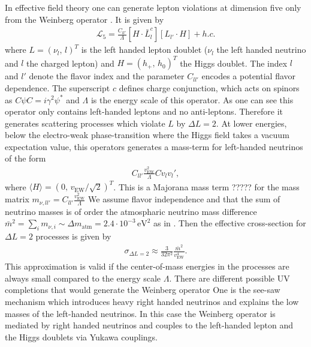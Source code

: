 \documentclass[13pt,a4paper,twoside,titlepage]{article}
\begin{document}
In effective field theory one can generate lepton violations at dimension five only from the
Weinberg operator \cite{Weinberg_operator_original_PhysRevLett.43.1566}. It is given by \cite[eq. 2]{Weinberg_at_colliders_Fuks_2021}
\begin{align}
\mathcal{L}_5 = \frac{C_{l l'}}{\Lambda} [H \cdot \bar{L}^c_l] [L_{l'} \cdot H] + h.c.
\end{align}
where $L = (\nu_l,\, l)^T$ is the left handed lepton doublet ($\nu_l$ the left handed neutrino and $l$ the charged lepton) and $H = (h_+,\, h_0)^T$ the Higgs doublet. The index $l$ and $l'$ denote the flavor index and the parameter $C_{l l'}$ encodes a potential flavor dependence.
The superscript $c$ defines charge conjunction, which acts on spinors as $C \psi C = i \gamma^2 \psi^*$
and $\Lambda$ is the energy scale of this operator.
As one can see this operator only contains left-handed leptons and no anti-leptons. Therefore
it generates scattering processes which violate $L$ by $\Delta L = 2$.
At lower energies, below the electro-weak phase-transition where the Higgs field takes a vacuum expectation value, this operators generates a mass-term for left-handed neutrinos of the form
\begin{align}
C_{ll'} \frac{v_{\mathrm{EW}}^2}{\Lambda} C v_l v_l',
\end{align}
where $\langle H \rangle = (0,\, v_{\mathrm{EW}} / \sqrt{2})^T$.
This is a Majorana mass term ????? for the mass matrix $m_{\nu, ll'} = C_{ll'} \frac{v_{\mathrm{EW}}^2}{\Lambda}$
We assume flavor independence and that the sum of neutrino masses
is of order the atmospharic neutrino mass difference $\bar{m}^2 = \sum_i m_{\nu, i} \sim \Delta m_{\mathrm{atm}} = 2.4 \cdot 10^{-3} \, \mathrm{eV}^2$ as in \cite{Kusenko_2015_Axion_Leptogenesis}.
Then the effective cross-section for $\Delta L = 2$ processes
is given by \cite[eq. 9]{Kusenko_2015_Axion_Leptogenesis}
\begin{align}
\sigma_{\Delta L = 2} \approx \frac{3}{32 \pi^2} \frac{\bar{m}^2}{v_{\mathrm{EW}}^4}.
\end{align}
This approximation is valid if the center-of-mass energies in the processes are always small compared to the energy scale $\Lambda$.
There are different possible UV completions that would generate the Weinberg operator
One is the see-saw mechanism which introduces heavy right handed neutrinos and explains the low masses of the left-handed neutrinos.
In this case the Weinberg operator is mediated by right handed neutrinos and
couples to the left-handed lepton and the Higgs doublets via Yukawa couplings.
\end{document}
